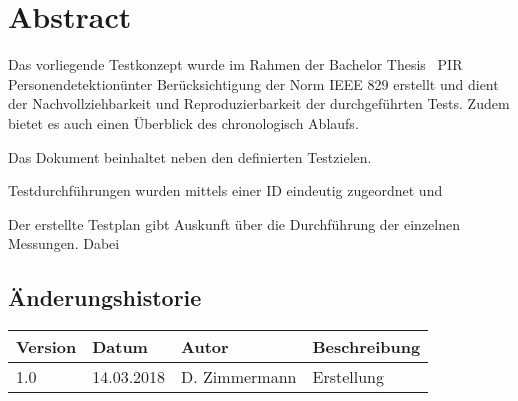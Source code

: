 \chapter*{Abstract}

Das vorliegende Testkonzept wurde im Rahmen der Bachelor Thesis \ PIR Personendetektion\" unter Berücksichtigung der Norm IEEE 829 erstellt und dient der Nachvollziehbarkeit und Reproduzierbarkeit der durchgeführten Tests. Zudem bietet es auch einen Überblick des chronologisch Ablaufs.

Das Dokument beinhaltet neben den definierten Testzielen.

Testdurchführungen wurden mittels einer ID eindeutig zugeordnet und 

Der erstellte Testplan gibt Auskunft über die Durchführung der einzelnen Messungen. Dabei  

\vfill
\hfill
 
\section*{Änderungshistorie}
\begin{longtable}{|p{2cm}|p{2cm}|p{3cm}|p{7cm}|} \hline
	
	\textbf{Version} & \textbf{Datum} & \textbf{Autor} & \textbf{Beschreibung}\\ \hline
	
	1.0 & 14.03.2018 & D. Zimmermann & Erstellung\\
	\hline
	
\end{longtable}
